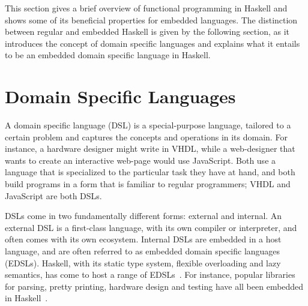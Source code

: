 \documentclass[../paper.tex]{subfiles}
\begin{document}

This section gives a brief overview of functional programming in Haskell and shows some of its beneficial properties for embedded languages. The distinction between regular and embedded Haskell is given by the following section, as it introduces the concept of domain specific languages and explains what it entails to be an embedded domain specific language in Haskell.


\section{Domain Specific Languages}
\label{domain}

A domain specific language (DSL) is a special-purpose language, tailored to a certain problem and captures the concepts and operations in its domain. For instance, a hardware designer might write in VHDL, while a web-designer that wants to create an interactive web-page would use JavaScript. Both use a language that is specialized to the particular task they have at hand, and both build programs in a form that is familiar to regular programmers; VHDL and JavaScript are both DSLs.

DSLs come in two fundamentally different forms: external and internal. An external DSL is a first-class language, with its own compiler or interpreter, and often comes with its own ecosystem. Internal DSLs are embedded in a host language, and are often referred to as embedded domain specific languages (EDSLs). Haskell, with its static type system, flexible overloading and lazy semantics, has come to host a range of EDSLs~\cite{elliott2003}. For instance, popular libraries for parsing, pretty printing, hardware design and testing have all been embedded in Haskell~\cite{leijen2002, hughes1995, bjesse1998}.
\end{document}
